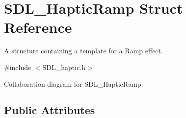 \hypertarget{struct_s_d_l___haptic_ramp}{\section{S\-D\-L\-\_\-\-Haptic\-Ramp Struct Reference}
\label{struct_s_d_l___haptic_ramp}
}


A structure containing a template for a Ramp effect.  




{\ttfamily \#include $<$S\-D\-L\-\_\-haptic.\-h$>$}



Collaboration diagram for S\-D\-L\-\_\-\-Haptic\-Ramp\-:
\subsection*{Public Attributes}

